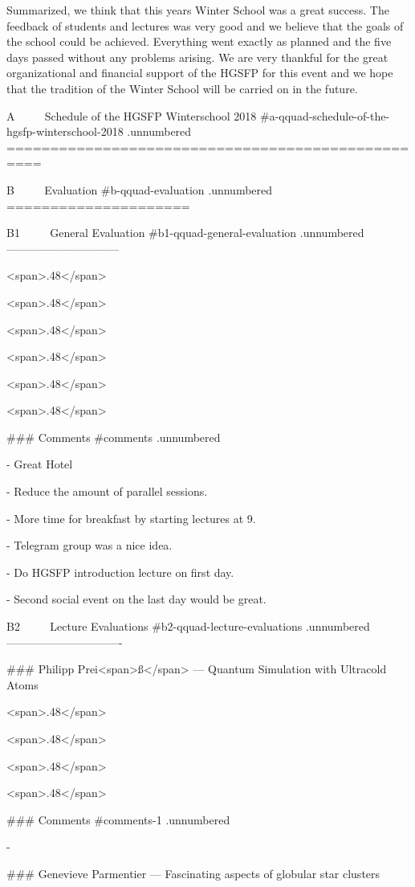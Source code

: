 Summarized, we think that this years Winter School was a great success.
The feedback of students and lectures was very good and we believe that
the goals of the school could be achieved. Everything went exactly as
planned and the five days passed without any problems arising. We are
very thankful for the great organizational and financial support of the
HGSFP for this event and we hope that the tradition of the Winter School
will be carried on in the future.

A $\qquad$ Schedule of the HGSFP Winterschool 2018 {#a-qquad-schedule-of-the-hgsfp-winterschool-2018 .unnumbered}
==================================================

B $\qquad$ Evaluation {#b-qquad-evaluation .unnumbered}
=====================

B1 $\qquad$ General Evaluation {#b1-qquad-general-evaluation .unnumbered}
------------------------------

<span>.48</span>

<span>.48</span>

<span>.48</span>

<span>.48</span>

<span>.48</span>

<span>.48</span>

### Comments {#comments .unnumbered}

-   Great Hotel

-   Reduce the amount of parallel sessions.

-   More time for breakfast by starting lectures at 9.

-   Telegram group was a nice idea.

-   Do HGSFP introduction lecture on first day.

-   Second social event on the last day would be great.

B2 $\qquad$ Lecture Evaluations {#b2-qquad-lecture-evaluations .unnumbered}
-------------------------------

### Philipp Prei<span>ß</span> — Quantum Simulation with Ultracold Atoms 

<span>.48</span>

<span>.48</span>

<span>.48</span>

<span>.48</span>

### Comments {#comments-1 .unnumbered}

-

### Genevieve Parmentier — Fascinating aspects of globular star clusters 

